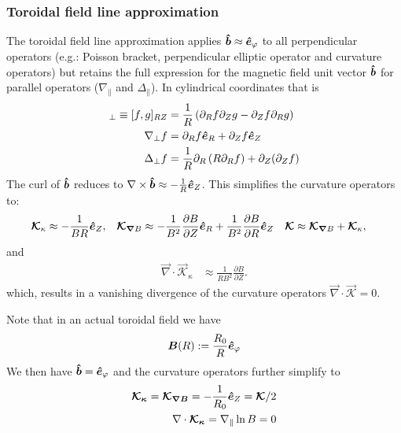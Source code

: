 \subsubsection{Toroidal field line approximation}\label{sec:torfieldlineapprox}
The toroidal field line approximation applies \(\bm{\hat{b}}\approx \bm{\hat{e}}_\varphi\) to all perpendicular operators
(e.g.: Poisson bracket, perpendicular elliptic operator and curvature operators)
but retains the full expression for the magnetic field unit vector \(\bm{\hat{b}}\)
for parallel operators (\(\nabla_\parallel\) and \(\Delta_\parallel\)).
In cylindrical coordinates that is
\begin{align}
[f,g]_\perp \equiv [f,g]_{RZ} &= \frac{1}{R} \left(\partial_R f\partial_Z g - \partial_Z f\partial_R g\right) \\
\nabla_\perp f &= \partial_R f \ehat_R + \partial_Z f \ehat_Z \\
\Delta_\perp f &= \frac{1}{R}\partial_R \left( R \partial_R f\right) + \partial_Z(\partial_Z f)
\label{}
\end{align}
The curl of $\bm{\hat{b}}$ reduces to
 $\nabla\times\bm{\hat{b}} \approx -  \frac{1}{R} \bm{\hat{e}}_Z$.
This simplifies the curvature operators to:
\begin{align}
{\boldsymbol{\mathcal{K}}}_{\kappa}  &\approx  -  \frac{1}{B R} \bm{\hat{e}}_Z , &
{\boldsymbol{ \mathcal{K} }}_{{\boldsymbol{\nabla}}  B}  &\approx  -\frac{1}{B^2}\frac{\partial B}{\partial Z}\bm{\hat{e}}_R +\frac{1}{B^2} \frac{\partial B}{\partial R}\bm{\hat{e}}_Z &
{\boldsymbol{ \mathcal{K} }} &\approx {\boldsymbol{ \mathcal{K} }}_{{\boldsymbol{\nabla}}  B}  +{\boldsymbol{ \mathcal{K} }}_{\kappa} ,
\end{align}
and
\begin{align}
 \vec{\nabla} \cdot \vec{\mathcal{K}}_{\kappa} &\approx \frac{1}{R B^2} \frac{\partial B}{\partial Z}.
\end{align}
which, results in a vanishing divergence of the curvature operators \( \vec{\nabla} \cdot \vec{ \mathcal{K} } = 0\).

Note that in an actual toroidal field we have
\begin{align}
  {\boldsymbol{B}}(R) := \frac{R_0}{R} \bm{\hat{e}}_\varphi
  \label{}
\end{align}
We then have $\bm{\hat{b}} = \bm{\hat{e}}_\varphi$ and the curvature operators further
simplify to
\begin{align}
  {\boldsymbol{ \mathcal K_\kappa}} = {\boldsymbol{ \mathcal K_{\nabla B}}} = -\frac{1}{R_0} \bm{\hat{e}}_Z =
{\boldsymbol{ \mathcal K}}/2\\
  \nabla\cdot{\boldsymbol{\mathcal K_{\kappa}}}=
    \nabla_\parallel \ln B = 0
    \label{}
\end{align}

